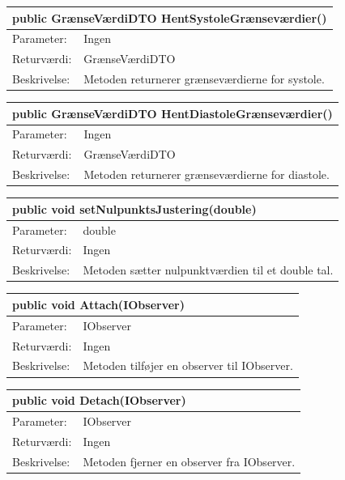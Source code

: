 \begin{table}[H]
\label{tab:tabel2}
\begin{tabular}{| l | p{13cm} |}
   \hline
   \multicolumn{2}{|l|}{public GrænseVærdiDTO HentSystoleGrænseværdier()} \\ \hline
   Parameter: & Ingen \\ \hline
   Returværdi: & GrænseVærdiDTO\\ \hline
   Beskrivelse: & Metoden returnerer grænseværdierne for systole.\\ \hline
\end{tabular}
\end{table}
\begin{table}[H]
\label{tab:tabel2}
\begin{tabular}{| l | p{13cm} |}
   \hline
   \multicolumn{2}{|l|}{public GrænseVærdiDTO HentDiastoleGrænseværdier()} \\ \hline
   Parameter: & Ingen \\ \hline
   Returværdi: & GrænseVærdiDTO\\ \hline
   Beskrivelse: & Metoden returnerer grænseværdierne for diastole.\\ \hline
\end{tabular}
\end{table}
\begin{table}[H]
\label{tab:tabel2}
\begin{tabular}{| l | p{13cm} |}
   \hline
   \multicolumn{2}{|l|}{public void setNulpunktsJustering(double)} \\ \hline
   Parameter: & double \\ \hline
   Returværdi: & Ingen\\ \hline
   Beskrivelse: & Metoden sætter nulpunktværdien til et double tal.\\ \hline
\end{tabular}
\end{table}
\begin{table}[H]
\label{tab:tabel2}
\begin{tabular}{| l | p{13cm} |}
   \hline
   \multicolumn{2}{|l|}{public void Attach(IObserver)} \\ \hline
   Parameter: & IObserver \\ \hline
   Returværdi: & Ingen\\ \hline
   Beskrivelse: & Metoden tilføjer en observer til IObserver.\\ \hline
\end{tabular}
\end{table}
\begin{table}[H]
\label{tab:tabel2}
\begin{tabular}{| l | p{13cm} |}
   \hline
   \multicolumn{2}{|l|}{public void Detach(IObserver)} \\ \hline
   Parameter: & IObserver \\ \hline
   Returværdi: & Ingen\\ \hline
   Beskrivelse: & Metoden fjerner en observer fra IObserver.\\ \hline
\end{tabular}
\end{table}
